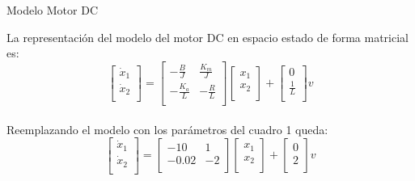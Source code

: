 \documentclass{beamer}
\begin{document}
\begin{frame}{Modelo Motor DC}
\begin{justify}
\vspace{0.3cm}
\begin{itemize}  
  
La representación del modelo del motor DC en espacio estado de forma matricial es:
\[
\begin{bmatrix}
    \dot{x}_1 \\
    \dot{x}_2 \\
\end{bmatrix}
=
\begin{bmatrix}
    -\frac{B}{J} & \frac{K_m}{J} \\
    -\frac{K_a}{L} & -\frac{R}{L} \\
\end{bmatrix}
\begin{bmatrix}
    x_1 \\
    x_2 \\
\end{bmatrix}
+
\begin{bmatrix}
    0 \\
    \frac{1}{L} \\
\end{bmatrix} v
\]
\\
Reemplazando el modelo con los parámetros del cuadro 1 queda:
\[
\begin{bmatrix}
    \dot{x}_1 \\
    \dot{x}_2 \\
\end{bmatrix}
=
\begin{bmatrix}
    -10 & 1 \\
    -0.02 & -2 \\
\end{bmatrix}
\begin{bmatrix}
    x_1 \\
    x_2 \\
\end{bmatrix}
+
\begin{bmatrix}
    0 \\
    2 \\
\end{bmatrix} v
\]

\end{itemize}
\end{justify}
\end{frame}
\end{document}
